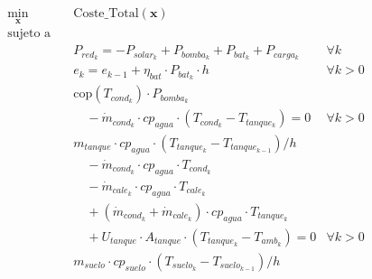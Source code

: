 \begin{align}
	\min_{\mathbf{x}} \quad & \text{Coste\_Total}(\mathbf{x})                                                                                                                \\
	\text{sujeto a} \quad   &                                                                                                                                                \\
	                        & P_{red_k} = -P_{solar_k} + P_{bomba_k} + P_{bat_k} + P_{carga_k} \quad                                                         & \forall k     \\
	                        & e_k = e_{k-1} + \eta_{bat} \cdot P_{bat_k} \cdot h \quad                                                                       & \forall k > 0 \\
	                        & \text{cop}(T_{cond_k}) \cdot P_{bomba_k} \nonumber                                                                                             \\
	                        & \quad - \dot{m}_{cond_k} \cdot cp_{agua} \cdot (T_{cond_k} - T_{tanque_k}) = 0 \label{eq:sys_1_sand}                           & \forall k > 0 \\
	                        & m_{tanque} \cdot cp_{agua} \cdot ( T_{tanque_k} - T_{tanque_{k-1}}) / h  \nonumber                                                             \\
	                        & \quad - \dot{m}_{cond_k} \cdot cp_{agua} \cdot T_{cond_k} \nonumber                                                                            \\
	                        & \quad - \dot{m}_{cale_k} \cdot cp_{agua} \cdot T_{cale_k} \nonumber                                                                            \\
	                        & \quad + (\dot{m}_{cond_k} + \dot{m}_{cale_k}) \cdot cp_{agua} \cdot T_{tanque_k} \nonumber                                                     \\
	                        & \quad + U_{tanque} \cdot A_{tanque} \cdot (T_{tanque_k} - T_{amb_k}) = 0 \label{eq:sys_2_sand}                                 & \forall k > 0 \\
	                        & m_{suelo} \cdot cp_{suelo} \cdot ( T_{suelo_k} - T_{suelo_{k-1}}) / h \nonumber                                                                \\

\end{align}
